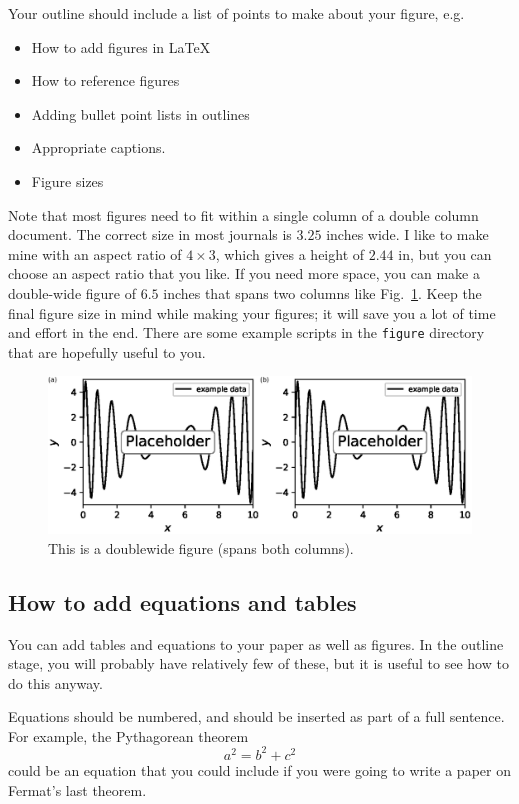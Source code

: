 \documentclass[journal=mamobx, layout=twocolumn]{achemso}
\begin{document}
Your outline should include a list of points to make about your figure, e.g.\
\begin{itemize}
  \item How to add figures in LaTeX
  \item How to reference figures
  \item Adding bullet point lists in outlines
  \item Appropriate captions.
  \item Figure sizes
\end{itemize}

Note that most figures need to fit within a single column of a double column document.
The correct size in most journals is $3.25$ inches wide.
I like to make mine with an aspect ratio of $4\times3$, which gives a height of $2.44$ in, but you can choose an aspect ratio that you like.
If you need more space, you can make a double-wide figure of $6.5$ inches that spans two columns like Fig.~\ref{fig-doublewide}.
Keep the final figure size in mind while making your figures; it will save you a lot of time and effort in the end.
There are some example scripts in the \texttt{figure} directory that are hopefully useful to you.

\begin{figure}[tbp]
  \includegraphics[width=6.5in]{fig-doublewide}
  \caption{This is a doublewide figure (spans both columns).}
  \label{fig-doublewide}
\end{figure}

\subsection{How to add equations and tables}

You can add tables and equations to your paper as well as figures.
In the outline stage, you will probably have relatively few of these, but it is useful to see how to do this anyway.

Equations should be numbered, and should be inserted as part of a full sentence.
For example, the Pythagorean theorem
\begin{equation}
a^{2} = b^{2} + c^{2}
\end{equation}
could be an equation that you could include if you were going to write a paper on Fermat's last theorem.
\end{document}
